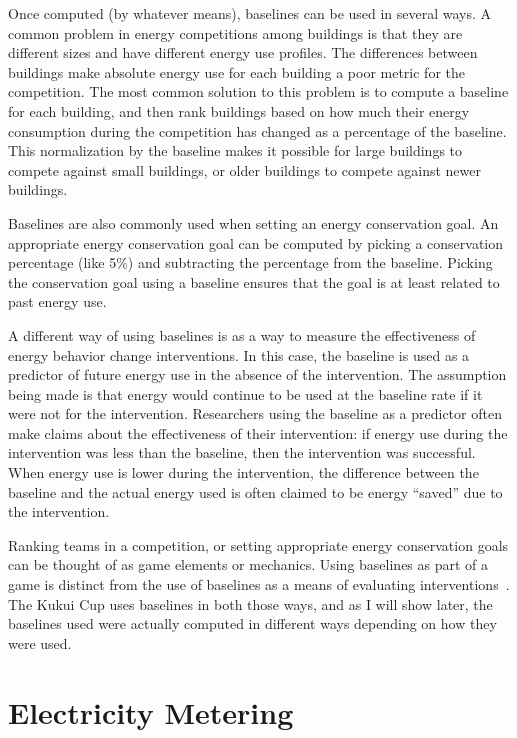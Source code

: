 Once computed (by whatever means), baselines can be used in several ways. A common problem in energy competitions among buildings is that they are different sizes and have different energy use profiles. The differences between buildings make absolute energy use for each building a poor metric for the competition. The most common solution to this problem is to compute a baseline for each building, and then rank buildings based on how much their energy consumption during the competition has changed as a percentage of the baseline. This normalization by the baseline makes it possible for large buildings to compete against small buildings, or older buildings to compete against newer buildings.

Baselines are also commonly used when setting an energy conservation goal. An appropriate energy conservation goal can be computed by picking a conservation percentage (like 5\%) and subtracting the percentage from the baseline. Picking the conservation goal using a baseline ensures that the goal is at least related to past energy use.

A different way of using baselines is as a way to measure the effectiveness of energy behavior change interventions. In this case, the baseline is used as a predictor of future energy use in the absence of the intervention. The assumption being made is that energy would continue to be used at the baseline rate if it were not for the intervention. Researchers using the baseline as a predictor often make claims about the effectiveness of their intervention: if energy use during the intervention was less than the baseline, then the intervention was successful. When energy use is lower during the intervention, the difference between the baseline and the actual energy used is often claimed to be energy ``saved'' due to the intervention.

Ranking teams in a competition, or setting appropriate energy conservation goals can be thought of as game elements or mechanics. Using baselines as part of a game is distinct from the use of baselines as a means of evaluating interventions~\cite{csdl2-12-08}. The Kukui Cup uses baselines in both those ways, and as I will show later, the baselines used were actually computed in different ways depending on how they were used.


\section{Electricity Metering}


